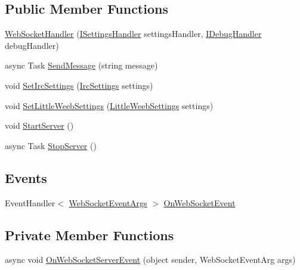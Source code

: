 \subsection*{Public Member Functions}
\begin{DoxyCompactItemize}
\item 
\mbox{\hyperlink{class_little_weeb_library_1_1_handlers_1_1_web_socket_handler_aa420f7ed35d16df6ef6f18bd0ab8fa3a}{Web\+Socket\+Handler}} (\mbox{\hyperlink{interface_little_weeb_library_1_1_handlers_1_1_i_settings_handler}{I\+Settings\+Handler}} settings\+Handler, \mbox{\hyperlink{interface_little_weeb_library_1_1_handlers_1_1_i_debug_handler}{I\+Debug\+Handler}} debug\+Handler)
\item 
async Task \mbox{\hyperlink{class_little_weeb_library_1_1_handlers_1_1_web_socket_handler_a1de289d54d665a32c93478c68d3e6ad0}{Send\+Message}} (string message)
\item 
void \mbox{\hyperlink{class_little_weeb_library_1_1_handlers_1_1_web_socket_handler_a9c13ff9ec9ed3dfc07235f47332276d1}{Set\+Irc\+Settings}} (\mbox{\hyperlink{class_little_weeb_library_1_1_settings_1_1_irc_settings}{Irc\+Settings}} settings)
\item 
void \mbox{\hyperlink{class_little_weeb_library_1_1_handlers_1_1_web_socket_handler_a7ca1faf86f9796afd4c9981a7c961f3b}{Set\+Little\+Weeb\+Settings}} (\mbox{\hyperlink{class_little_weeb_library_1_1_settings_1_1_little_weeb_settings}{Little\+Weeb\+Settings}} settings)
\item 
void \mbox{\hyperlink{class_little_weeb_library_1_1_handlers_1_1_web_socket_handler_a23d4ffbabdb67c97ea843d4e7dc5cbdd}{Start\+Server}} ()
\item 
async Task \mbox{\hyperlink{class_little_weeb_library_1_1_handlers_1_1_web_socket_handler_abcd87ac26780369b500299fc12aa0039}{Stop\+Server}} ()
\end{DoxyCompactItemize}
\subsection*{Events}
\begin{DoxyCompactItemize}
\item 
Event\+Handler$<$ \mbox{\hyperlink{class_little_weeb_library_1_1_event_arguments_1_1_web_socket_event_args}{Web\+Socket\+Event\+Args}} $>$ \mbox{\hyperlink{class_little_weeb_library_1_1_handlers_1_1_web_socket_handler_a77ea6ec1d9b66676ebb1491cb42b3ec9}{On\+Web\+Socket\+Event}}
\end{DoxyCompactItemize}
\subsection*{Private Member Functions}
\begin{DoxyCompactItemize}
\item 
async void \mbox{\hyperlink{class_little_weeb_library_1_1_handlers_1_1_web_socket_handler_a527c7515f2e19938e9ff23ce2d993fda}{On\+Web\+Socket\+Server\+Event}} (object sender, Web\+Socket\+Event\+Arg args)
\end{DoxyCompactItemize}
